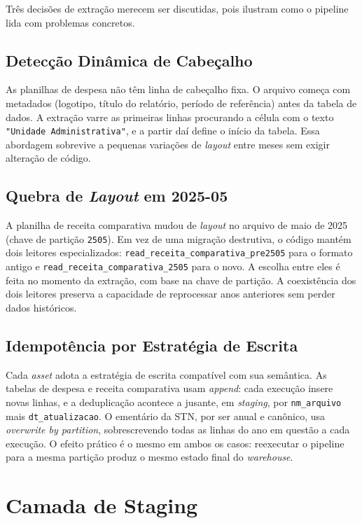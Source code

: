 Três decisões de extração merecem ser discutidas, pois ilustram como o pipeline lida com problemas concretos.

\subsection{Detecção Dinâmica de Cabeçalho}

As planilhas de despesa não têm linha de cabeçalho fixa. O arquivo começa com metadados (logotipo, título do relatório, período de referência) antes da tabela de dados. A extração varre as primeiras linhas procurando a célula com o texto \texttt{"Unidade Administrativa"}, e a partir daí define o início da tabela. Essa abordagem sobrevive a pequenas variações de \textit{layout} entre meses sem exigir alteração de código.

\subsection{Quebra de \textit{Layout} em 2025-05}

A planilha de receita comparativa mudou de \textit{layout} no arquivo de maio de 2025 (chave de partição \texttt{2505}). Em vez de uma migração destrutiva, o código mantém dois leitores especializados: \texttt{read\_receita\_comparativa\_pre2505} para o formato antigo e \texttt{read\_receita\_comparativa\_2505} para o novo. A escolha entre eles é feita no momento da extração, com base na chave de partição. A coexistência dos dois leitores preserva a capacidade de reprocessar anos anteriores sem perder dados históricos.

\subsection{Idempotência por Estratégia de Escrita}

Cada \textit{asset} adota a estratégia de escrita compatível com sua semântica. As tabelas de despesa e receita comparativa usam \textit{append}: cada execução insere novas linhas, e a deduplicação acontece a jusante, em \textit{staging}, por \texttt{nm\_arquivo} mais \texttt{dt\_atualizacao}. O ementário da STN, por ser anual e canônico, usa \textit{overwrite by partition}, sobrescrevendo todas as linhas do ano em questão a cada execução. O efeito prático é o mesmo em ambos os casos: reexecutar o pipeline para a mesma partição produz o mesmo estado final do \textit{warehouse}.

\section{Camada de Staging}


